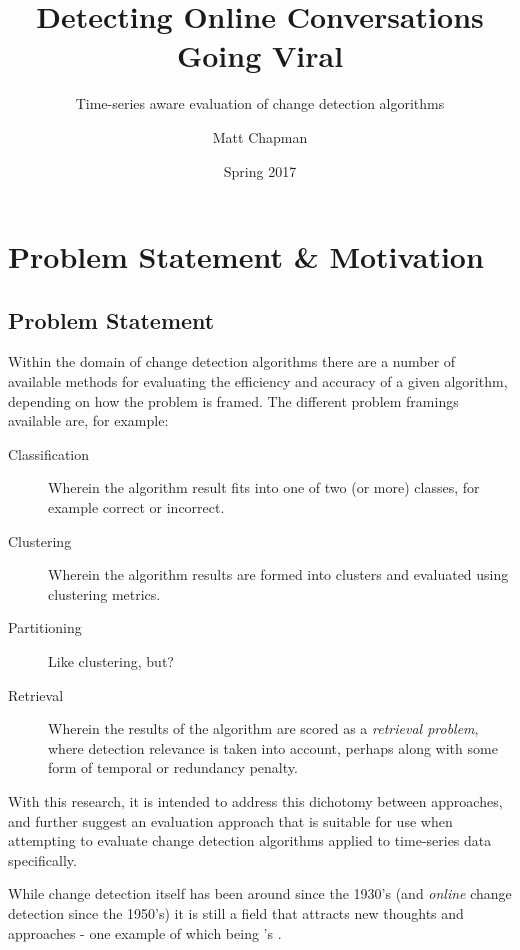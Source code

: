 \documentclass{uvamscse}	%
\title{Detecting Online Conversations Going Viral}
\subtitle{Time-series aware evaluation of change detection algorithms}
\date{Spring 2017}
\author{Matt Chapman}
\begin{document}
\nocite{*}
\maketitle


\chapter{Problem Statement \& Motivation}

\section{Problem Statement}

Within the domain of change detection algorithms there are a number of available methods for evaluating the efficiency
and accuracy of a given algorithm, depending on how the problem is framed. The different problem framings available are,
for example:

\begin{description}
	\item[Classification] Wherein the algorithm result fits into one of two (or more) classes, for example correct or
	incorrect.
	\item[Clustering] Wherein the algorithm results are formed into clusters and evaluated using clustering metrics.
	\item[Partitioning] Like clustering, but?
	\item[Retrieval] Wherein the results of the algorithm are scored as a \emph{retrieval problem}, where detection
	relevance is taken into account, perhaps along with some form of temporal or redundancy penalty.
\end{description}

With this research, it is intended to address this dichotomy between approaches, and further suggest an evaluation
approach that is suitable for use when attempting to evaluate change detection algorithms applied to time-series data
specifically.

While change detection itself has been around since the 1930's (and \emph{online} change detection since the 1950's) it
is still a field that attracts new thoughts and approaches - one example of which being \citeauthor{Ginsberg2009}'s
 \cite{Ginsberg2009}.
\end{document}
